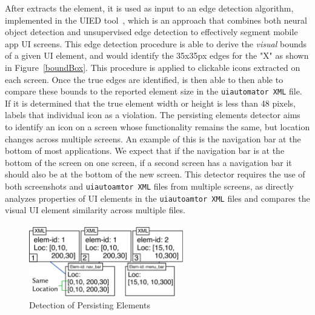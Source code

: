 After \MotorEase extracts the element, it is used as input to an edge detection algorithm, implemented in the UIED tool~\cite{UIED}, which is an approach that combines both neural object detection and unsupervised edge detection to effectively segment mobile app UI screens. This edge detection procedure is able to derive the \textit{visual} bounds of a given UI element, and would identify the 35x35px edges for the "X" as shown in Figure~\ref{boundBox}. This procedure is applied to clickable icons extracted on each screen. Once the true edges are identified, \MotorEase is then able to then able to compare these bounds to the reported element size in the \texttt{\small uiautomator XML} file. If it is determined that the true element width or height is less than 48 pixels, \MotorEase labels that individual icon as a violation.  
The persisting elements detector aims to identify an icon on a screen whose functionality remains the same, but location changes across multiple screens. An example of this is the navigation bar at the bottom of most applications. We expect that if the navigation bar is at the bottom of the screen on one screen, if a second screen has a navigation bar it should also be at the bottom of the new screen. 
This detector requires the use of both screenshots and \texttt{\small uiautoamtor XML} files from multiple screens, as \MotorEase directly analyzes properties of UI elements in the \texttt{\small uiautoamtor XML} files and compares the visual UI element similarity across multiple files.

\begin{figure}[t]
    \centering
    \includegraphics[width=0.6\textwidth]{imgs/persisting.pdf}
    \caption{Detection of Persisting Elements}
    \label{persistingDetect}
\end{figure}

